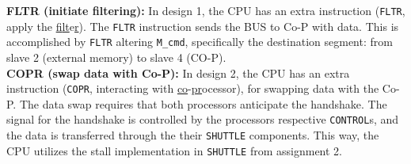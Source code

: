 \textbf{FLTR (initiate filtering):} In design 1, the CPU has an extra instruction (\texttt{FLTR}, apply the \underline{f}i\underline{lt}e\underline{r}). The \texttt{FLTR} instruction sends the BUS to Co-P with data. This is accomplished by \texttt{FLTR} altering \texttt{M\_cmd}, specifically the destination segment: from slave 2 (external memory) to slave 4 (CO-P).\\

\textbf{COPR (swap data with Co-P):} In design 2, the CPU has an extra instruction (\texttt{COPR}, interacting with \underline{co}-\underline{pr}ocessor), for swapping data with the Co-P. The data swap requires that both processors anticipate the handshake. The signal for the handshake is controlled by the processors respective \texttt{CONTROL}s, and the data is transferred through the their \texttt{SHUTTLE} components. This way, the CPU utilizes the stall implementation in \texttt{SHUTTLE} from assignment 2. \\

